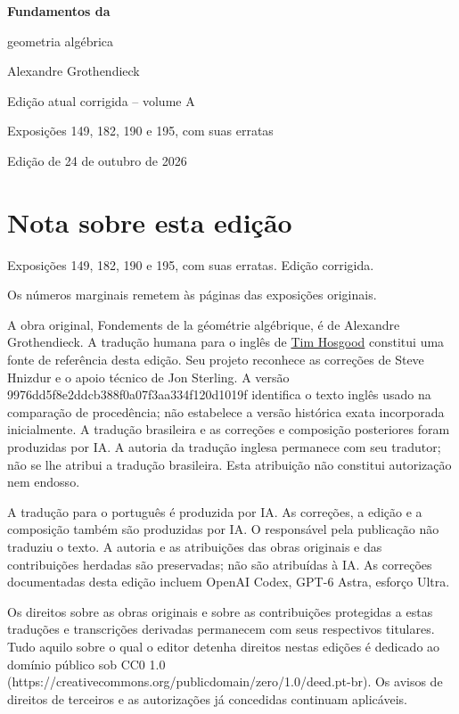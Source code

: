 \documentclass[11pt,twoside,openany]{book}
\begin{document}
\frontmatter
\begin{titlepage}
\centering
\vspace*{0.13\textheight}
{\Huge\bfseries Fundamentos da\par geometria algébrica\par}
\vspace{1.5\baselineskip}
{\Large Alexandre Grothendieck\par}
\vfill
{\Large Edição atual corrigida -- volume A\par}
\vspace{\baselineskip}
{\large Exposições 149, 182, 190 e 195, com suas erratas\par}
\vspace{1.5\baselineskip}
{\normalsize Edição de 24 de outubro de 2026\par}
\end{titlepage}
\chapter*{Nota sobre esta edição}
Exposições 149, 182, 190 e 195, com suas erratas. Edição corrigida.

Os números marginais remetem às páginas das exposições originais.

A obra original, Fondements de la géométrie algébrique, é de Alexandre Grothendieck. A tradução humana para o inglês de \href{https://github.com/thosgood/fga/tree/9976dd5f8e2ddcb388f0a07f3aa334f120d1019f}{Tim Hosgood} constitui uma fonte de referência desta edição. Seu projeto reconhece as correções de Steve Hnizdur e o apoio técnico de Jon Sterling. A versão 9976dd5f8e2ddcb388f0a07f3aa334f120d1019f identifica o texto inglês usado na comparação de procedência; não estabelece a versão histórica exata incorporada inicialmente. A tradução brasileira e as correções e composição posteriores foram produzidas por IA. A autoria da tradução inglesa permanece com seu tradutor; não se lhe atribui a tradução brasileira. Esta atribuição não constitui autorização nem endosso.

A tradução para o português é produzida por IA. As correções, a edição e a composição também são produzidas por IA. O responsável pela publicação não traduziu o texto. A autoria e as atribuições das obras originais e das contribuições herdadas são preservadas; não são atribuídas à IA. As correções documentadas desta edição incluem OpenAI Codex, GPT-6 Astra, esforço Ultra.

Os direitos sobre as obras originais e sobre as contribuições protegidas a estas traduções e transcrições derivadas permanecem com seus respectivos titulares. Tudo aquilo sobre o qual o editor detenha direitos nestas edições é dedicado ao domínio público sob CC0 1.0 (https://creativecommons.org/publicdomain/zero/1.0/deed.pt-br). Os avisos de direitos de terceiros e as autorizações já concedidas continuam aplicáveis.
\end{document}
